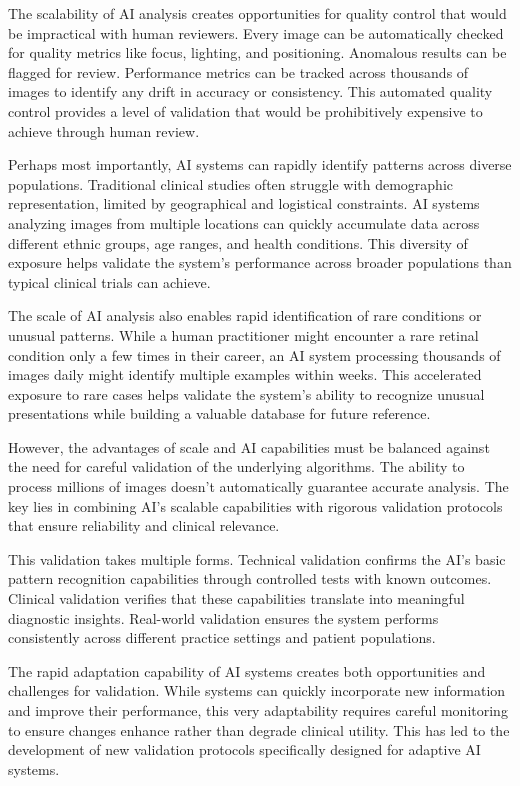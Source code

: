 \documentclass[
  Letterpaper,
]{scrbook}
\begin{document}
The scalability of AI analysis creates opportunities for quality control
that would be impractical with human reviewers. Every image can be
automatically checked for quality metrics like focus, lighting, and
positioning. Anomalous results can be flagged for review. Performance
metrics can be tracked across thousands of images to identify any drift
in accuracy or consistency. This automated quality control provides a
level of validation that would be prohibitively expensive to achieve
through human review.

Perhaps most importantly, AI systems can rapidly identify patterns
across diverse populations. Traditional clinical studies often struggle
with demographic representation, limited by geographical and logistical
constraints. AI systems analyzing images from multiple locations can
quickly accumulate data across different ethnic groups, age ranges, and
health conditions. This diversity of exposure helps validate the
system's performance across broader populations than typical clinical
trials can achieve.

The scale of AI analysis also enables rapid identification of rare
conditions or unusual patterns. While a human practitioner might
encounter a rare retinal condition only a few times in their career, an
AI system processing thousands of images daily might identify multiple
examples within weeks. This accelerated exposure to rare cases helps
validate the system's ability to recognize unusual presentations while
building a valuable database for future reference.

However, the advantages of scale and AI capabilities must be balanced
against the need for careful validation of the underlying algorithms.
The ability to process millions of images doesn't automatically
guarantee accurate analysis. The key lies in combining AI's scalable
capabilities with rigorous validation protocols that ensure reliability
and clinical relevance.

This validation takes multiple forms. Technical validation confirms the
AI's basic pattern recognition capabilities through controlled tests
with known outcomes. Clinical validation verifies that these
capabilities translate into meaningful diagnostic insights. Real-world
validation ensures the system performs consistently across different
practice settings and patient populations.

The rapid adaptation capability of AI systems creates both opportunities
and challenges for validation. While systems can quickly incorporate new
information and improve their performance, this very adaptability
requires careful monitoring to ensure changes enhance rather than
degrade clinical utility. This has led to the development of new
validation protocols specifically designed for adaptive AI systems.
\end{document}
